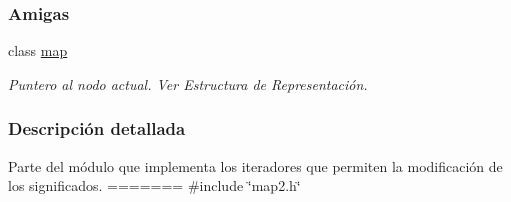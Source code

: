 \subsubsection*{\-Amigas}
\begin{DoxyCompactItemize}
\item 
class \hyperlink{classaed2_1_1iterator_1_1iterator_aeda338414e516b47761f994fb78056c6_aeda338414e516b47761f994fb78056c6}{map}
\begin{DoxyCompactList}\small\item\em \-Puntero al nodo actual. \-Ver \-Estructura de \-Representación. \end{DoxyCompactList}\end{DoxyCompactItemize}


\subsubsection{\-Descripción detallada}
\-Parte del módulo que implementa los iteradores que permiten la modificación de los significados. 
=======
{\ttfamily \#include \char`\"{}map2.\+h\char`\"{}}

